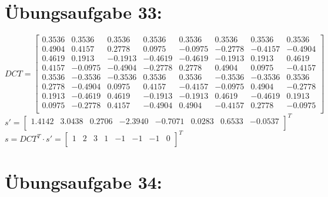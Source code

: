\newpage
	\section*{Übungsaufgabe 33:}

	$
	DCT =
	\begin{bmatrix}
	0.3536 &    0.3536 &   0.3536 &   0.3536 &   0.3536 &   0.3536 &   0.3536 &   0.3536 \\
	0.4904 &    0.4157 &   0.2778 &   0.0975 &  -0.0975 &  -0.2778 &  -0.4157 &  -0.4904 \\
	0.4619 &    0.1913 &  -0.1913 &  -0.4619 &  -0.4619 &  -0.1913 &   0.1913 &   0.4619 \\
	0.4157 &   -0.0975 &  -0.4904 &  -0.2778 &   0.2778 &   0.4904 &   0.0975 &  -0.4157 \\
	0.3536 &   -0.3536 &  -0.3536 &   0.3536 &   0.3536 &  -0.3536 &  -0.3536 &   0.3536 \\ 
	0.2778 &   -0.4904 &   0.0975 &   0.4157 &  -0.4157 &  -0.0975 &   0.4904 &  -0.2778 \\
	0.1913 &   -0.4619 &   0.4619 &  -0.1913 &  -0.1913 &   0.4619 &  -0.4619 &   0.1913 \\
	0.0975 &   -0.2778 &   0.4157 &  -0.4904 &   0.4904 &  -0.4157 &   0.2778 &  -0.0975 \\
	\end{bmatrix}
	$ \\ $
	s' =
	\begin{bmatrix}
	1.4142 &    3.0438 &   0.2706 &  -2.3940 &  -0.7071 &   0.0283 &   0.6533 &  -0.0537 \\
	\end{bmatrix}
	^T $ \\ $
	s = DCT^T \cdot s' =
	\begin{bmatrix}
	1 &    2 &    3 &    1 &   -1 &   -1 &   -1 &    0 \\
	\end{bmatrix}
	^T $
	
\newpage
	\section*{Übungsaufgabe 34:}

